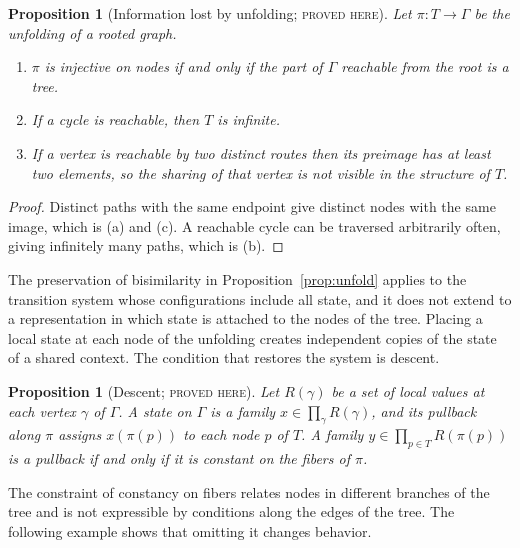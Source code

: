 \documentclass[11pt]{article}
\newtheorem{proposition}[theorem]{Proposition}
\theoremstyle{definition}
\theoremstyle{remark}
\newcommand{\stN}{\textsc{proved here}}
\begin{document}
\begin{proposition}[Information lost by unfolding; \stN]\label{prop:unfoldloss}
Let $\pi:T\to\Gamma$ be the unfolding of a rooted graph.
\begin{enumerate}[label=(\alph*)]
\item $\pi$ is injective on nodes if and only if the part of $\Gamma$ reachable from the root is a tree.
\item If a cycle is reachable, then $T$ is infinite.
\item If a vertex is reachable by two distinct routes then its preimage has at least two elements, so the sharing of that vertex is not visible in the structure of $T$.
\end{enumerate}
\end{proposition}
\begin{proof}
Distinct paths with the same endpoint give distinct nodes with the same image, which is (a) and (c). A reachable cycle can be traversed arbitrarily often, giving infinitely many paths, which is (b).
\end{proof}

The preservation of bisimilarity in Proposition~\ref{prop:unfold} applies to the transition system whose configurations include all state, and it does not extend to a representation in which state is attached to the nodes of the tree. Placing a local state at each node of the unfolding creates independent copies of the state of a shared context. The condition that restores the system is descent.

\begin{proposition}[Descent; \stN]\label{prop:descent}
Let $R(\gamma)$ be a set of local values at each vertex $\gamma$ of $\Gamma$. A state on $\Gamma$ is a family $x\in\prod_\gamma R(\gamma)$, and its pullback along $\pi$ assigns $x(\pi(p))$ to each node $p$ of $T$. A family $y\in\prod_{p\in T}R(\pi(p))$ is a pullback if and only if it is constant on the fibers of $\pi$.
\end{proposition}

The constraint of constancy on fibers relates nodes in different branches of the tree and is not expressible by conditions along the edges of the tree. The following example shows that omitting it changes behavior.
\end{document}
